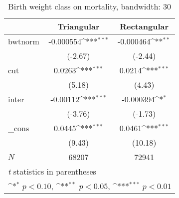 \begin{table}[htbp]\centering
\def\sym#1{\ifmmode^{#1}\else\(^{#1}\)\fi}
\caption{Birth weight class on mortality, bandwidth: 30}
\begin{tabular}{l*{2}{c}}
\hline\hline
            &\multicolumn{1}{c}{Triangular}&\multicolumn{1}{c}{Rectangular}\\
\hline
bwtnorm     &   -0.000554\sym{***}&   -0.000464\sym{**} \\
            &     (-2.67)         &     (-2.44)         \\
[1em]
cut         &      0.0263\sym{***}&      0.0214\sym{***}\\
            &      (5.18)         &      (4.43)         \\
[1em]
inter       &    -0.00112\sym{***}&   -0.000394\sym{*}  \\
            &     (-3.76)         &     (-1.73)         \\
[1em]
\_cons      &      0.0445\sym{***}&      0.0461\sym{***}\\
            &      (9.43)         &     (10.18)         \\
\hline
\(N\)       &       68207         &       72941         \\
\hline\hline
\multicolumn{3}{l}{\footnotesize \textit{t} statistics in parentheses}\\
\multicolumn{3}{l}{\footnotesize \sym{*} \(p<0.10\), \sym{**} \(p<0.05\), \sym{***} \(p<0.01\)}\\
\end{tabular}
\end{table}
